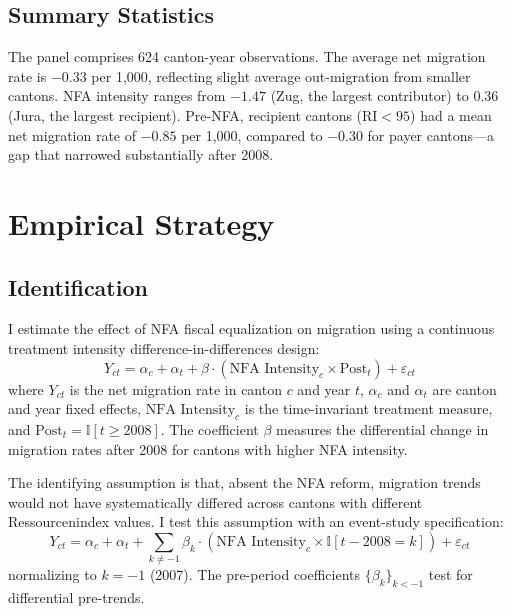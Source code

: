 \documentclass[12pt]{article}
\newcommand{\ind}{\mathbb{I}}
\begin{document}
\subsection{Summary Statistics}



The panel comprises 624 canton-year observations. The average net migration rate is $-0.33$ per 1,000, reflecting slight average out-migration from smaller cantons. NFA intensity ranges from $-1.47$ (Zug, the largest contributor) to $0.36$ (Jura, the largest recipient). Pre-NFA, recipient cantons ($\text{RI} < 95$) had a mean net migration rate of $-0.85$ per 1,000, compared to $-0.30$ for payer cantons---a gap that narrowed substantially after 2008.

\section{Empirical Strategy}

\subsection{Identification}

I estimate the effect of NFA fiscal equalization on migration using a continuous treatment intensity difference-in-differences design:
\begin{equation}
Y_{ct} = \alpha_c + \alpha_t + \beta \cdot (\text{NFA Intensity}_c \times \text{Post}_t) + \varepsilon_{ct}
\label{eq:main}
\end{equation}
where $Y_{ct}$ is the net migration rate in canton $c$ and year $t$, $\alpha_c$ and $\alpha_t$ are canton and year fixed effects, $\text{NFA Intensity}_c$ is the time-invariant treatment measure, and $\text{Post}_t = \ind[t \geq 2008]$. The coefficient $\beta$ measures the differential change in migration rates after 2008 for cantons with higher NFA intensity.

The identifying assumption is that, absent the NFA reform, migration trends would not have systematically differed across cantons with different Ressourcenindex values. I test this assumption with an event-study specification:
\begin{equation}
Y_{ct} = \alpha_c + \alpha_t + \sum_{k \neq -1} \beta_k \cdot (\text{NFA Intensity}_c \times \ind[t - 2008 = k]) + \varepsilon_{ct}
\label{eq:eventstudy}
\end{equation}
normalizing to $k = -1$ (2007). The pre-period coefficients $\{\beta_k\}_{k < -1}$ test for differential pre-trends.
\end{document}
